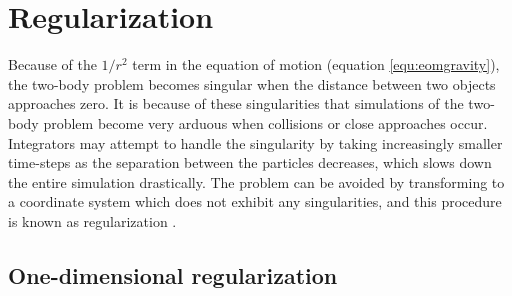 \documentclass[english, oneside]{HYgradu}
\begin{document}
\section{Regularization}

Because of the $1/r^2$ term in the equation of motion (equation \eqref{equ:eomgravity}), the two-body problem becomes singular when the distance between two objects approaches zero. It is because of these singularities that simulations of the two-body problem become very arduous when collisions or close approaches occur. Integrators may attempt to handle the singularity by taking increasingly smaller time-steps as the separation between the particles decreases, which slows down the entire simulation drastically. The problem can be avoided by transforming to a coordinate system which does not exhibit any singularities, and this procedure is known as regularization \citep{bt-galdyn}. 

\subsection{One-dimensional regularization}
\end{document}
